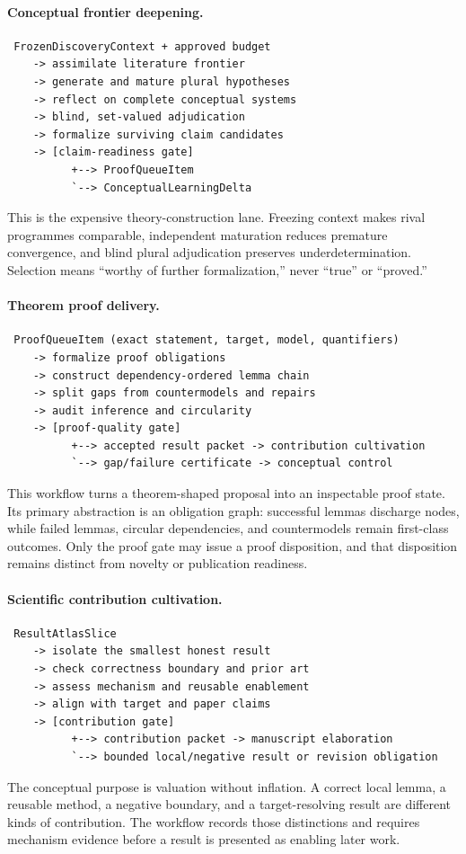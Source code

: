 \documentclass[11pt]{article}
\begin{document}
\paragraph{Conceptual frontier deepening.}
\begin{verbatim}
 FrozenDiscoveryContext + approved budget
    -> assimilate literature frontier
    -> generate and mature plural hypotheses
    -> reflect on complete conceptual systems
    -> blind, set-valued adjudication
    -> formalize surviving claim candidates
    -> [claim-readiness gate]
          +--> ProofQueueItem
          `--> ConceptualLearningDelta
\end{verbatim}
This is the expensive theory-construction lane.  Freezing context makes rival
programmes comparable, independent maturation reduces premature convergence,
and blind plural adjudication preserves underdetermination.  Selection means
``worthy of further formalization,'' never ``true'' or ``proved.''

\paragraph{Theorem proof delivery.}
\begin{verbatim}
 ProofQueueItem (exact statement, target, model, quantifiers)
    -> formalize proof obligations
    -> construct dependency-ordered lemma chain
    -> split gaps from countermodels and repairs
    -> audit inference and circularity
    -> [proof-quality gate]
          +--> accepted result packet -> contribution cultivation
          `--> gap/failure certificate -> conceptual control
\end{verbatim}
This workflow turns a theorem-shaped proposal into an inspectable proof state.
Its primary abstraction is an obligation graph: successful lemmas discharge
nodes, while failed lemmas, circular dependencies, and countermodels remain
first-class outcomes.  Only the proof gate may issue a proof disposition, and
that disposition remains distinct from novelty or publication readiness.

\paragraph{Scientific contribution cultivation.}
\begin{verbatim}
 ResultAtlasSlice
    -> isolate the smallest honest result
    -> check correctness boundary and prior art
    -> assess mechanism and reusable enablement
    -> align with target and paper claims
    -> [contribution gate]
          +--> contribution packet -> manuscript elaboration
          `--> bounded local/negative result or revision obligation
\end{verbatim}
The conceptual purpose is valuation without inflation.  A correct local lemma,
a reusable method, a negative boundary, and a target-resolving result are
different kinds of contribution.  The workflow records those distinctions and
requires mechanism evidence before a result is presented as enabling later
work.
\end{document}
